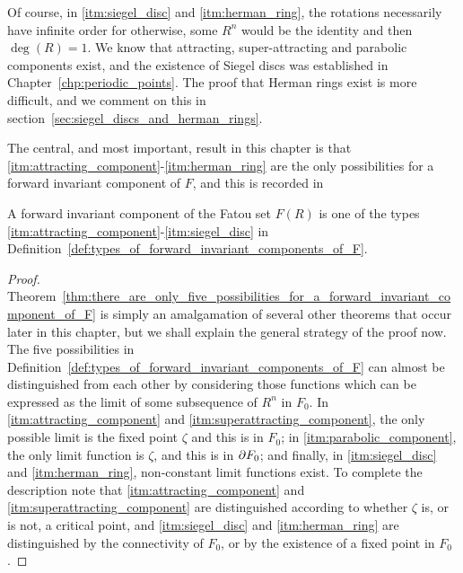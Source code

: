 Of course, in \ref{itm:siegel_disc} and \ref{itm:herman_ring}, the rotations
necessarily have infinite order for otherwise, some $R^n$ would be the identity
and then $\deg(R) = 1$. We know that attracting, super-attracting and parabolic
components exist, and the existence of Siegel discs was established in
Chapter~\ref{chp:periodic_points}. The proof that Herman rings exist is more
difficult, and we comment on this in
section~\ref{sec:siegel_discs_and_herman_rings}.

The central, and most important, result in this chapter is that
\ref{itm:attracting_component}-\ref{itm:herman_ring} are the only possibilities
for a forward invariant component of $F$, and this is recorded in

\begin{theorem}
    \label{thm:there_are_only_five_possibilities_for_a_forward_invariant_component_of_F}
    A forward invariant component of the Fatou set $F(R)$ is one of the types
    \ref{itm:attracting_component}-\ref{itm:siegel_disc} in
    Definition~\ref{def:types_of_forward_invariant_components_of_F}.
\end{theorem}
\begin{proof}
    Theorem~\ref{thm:there_are_only_five_possibilities_for_a_forward_invariant_component_of_F}
    is simply an amalgamation of several other theorems that occur later in this
    chapter, but we shall explain the general strategy of the proof now. The
    five possibilities in
    Definition~\ref{def:types_of_forward_invariant_components_of_F} can almost
    be distinguished from each other by considering those functions which can be
    expressed as the limit of some subsequence of $R^n$ in $F_0$. In
    \ref{itm:attracting_component} and \ref{itm:superattracting_component}, the
    only possible limit is the fixed point $\zeta$ and this is in $F_0$; in
    \ref{itm:parabolic_component}, the only limit function is $\zeta$, and this
    is in $\partial {F_0}$; and finally, in \ref{itm:siegel_disc} and
    \ref{itm:herman_ring}, non-constant limit functions exist. To complete the
    description note that \ref{itm:attracting_component} and
    \ref{itm:superattracting_component} are distinguished according to whether
    $\zeta$ is, or is not, a critical point, and \ref{itm:siegel_disc} and
    \ref{itm:herman_ring} are distinguished by the connectivity of $F_0$, or by
    the existence of a fixed point in $F_0$.
\end{proof}


